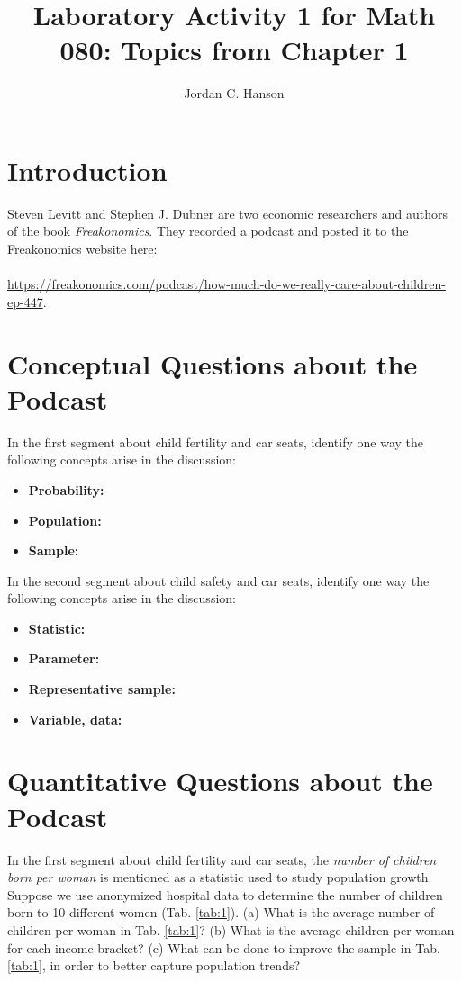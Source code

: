\documentclass{article}
\begin{document}
\title{Laboratory Activity 1 for Math 080: Topics from Chapter 1}
\author{Jordan C. Hanson}
\maketitle

\section{Introduction}

Steven Levitt and Stephen J. Dubner are two economic researchers and authors of the book \textit{Freakonomics}.  They recorded a podcast and posted it to the Freakonomics website here: \\ \\
\url{https://freakonomics.com/podcast/how-much-do-we-really-care-about-children-ep-447}.

\section{Conceptual Questions about the Podcast}

In the first segment about child fertility and car seats, identify one way the following concepts arise in the discussion:
\begin{itemize}
\item \textbf{Probability:}
\item \textbf{Population:}
\item \textbf{Sample:}
\end{itemize}
In the second segment about child safety and car seats, identify one way the following concepts arise in the discussion:
\begin{itemize}
\item \textbf{Statistic:}
\item \textbf{Parameter:}
\item \textbf{Representative sample:}
\item \textbf{Variable, data:}
\end{itemize}

\section{Quantitative Questions about the Podcast}

In the first segment about child fertility and car seats, the \textit{number of children born per woman} is mentioned as a statistic used to study population growth.  Suppose we use anonymized hospital data to determine the number of children born to 10 different women (Tab. \ref{tab:1}). (a) What is the average number of children per woman in Tab. \ref{tab:1}? (b) What is the average children per woman for each income bracket? (c) What can be done to improve the sample in Tab. \ref{tab:1}, in order to better capture population trends?
\end{document}
